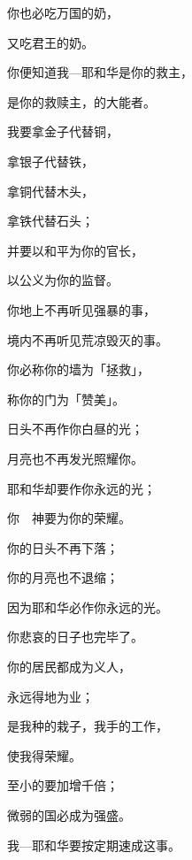 {\par }{\Q {}你也必吃万国的奶，
\par }{\Q 又吃君王的奶。
\par }{\Q 你便知道我—耶和华是你的救主，
\par }{\Q 是你的救赎主，{}的大能者。
\par }{\BB \par }{\Q {}我要拿金子代替铜，
\par }{\Q 拿银子代替铁，
\par }{\Q 拿铜代替木头，
\par }{\Q 拿铁代替石头；
\par }{\Q 并要以和平为你的官长，
\par }{\Q 以公义为你的监督。
\par }{\Q {}你地上不再听见强暴的事，
\par }{\Q 境内不再听见荒凉毁灭的事。
\par }{\Q 你必称你的墙为「拯救」，
\par }{\Q 称你的门为「赞美」。
\par }{\BB \par }{\Q {}日头不再作你白昼的光；
\par }{\Q 月亮也不再发光照耀你。
\par }{\Q 耶和华却要作你永远的光；
\par }{\Q 你　神要为你的荣耀。
\par }{\Q {}你的日头不再下落；
\par }{\Q 你的月亮也不退缩；
\par }{\Q 因为耶和华必作你永远的光。
\par }{\Q 你悲哀的日子也完毕了。
\par }{\Q {}你的居民都成为义人，
\par }{\Q 永远得地为业；
\par }{\Q 是我种的栽子，我手的工作，
\par }{\Q 使我得荣耀。
\par }{\Q {}至小的{}要加增千倍；
\par }{\Q 微弱的国必成为强盛。
\par }{\Q 我—耶和华要按定期速成这事。

}
